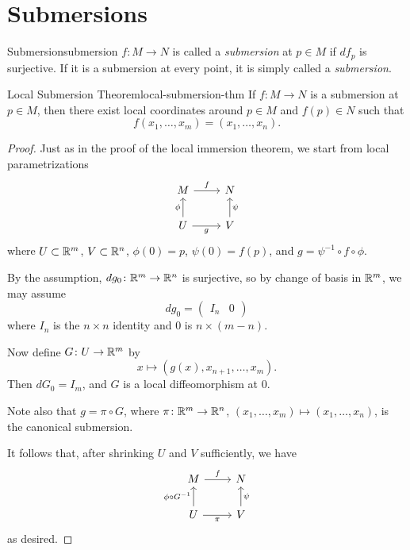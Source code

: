 
\section{Submersions}

\begin{definition}{Submersion}{submersion}
    $f \colon M \to N$ is called a \emph{submersion} at $p \in M$ if $df_p$ is surjective. If it is a submersion at every point, it is simply called a \emph{submersion}.
\end{definition}

\begin{theorem}{Local Submersion Theorem}{local-submersion-thm}
    If $f \colon M \to N$ is a submersion at $p \in M$, then there exist local coordinates around $p \in M$ and $f(p) \in N$ such that
    \[
        f(x_1, \ldots, x_m) = (x_1, \ldots, x_n).
    \]
\end{theorem}

\begin{proof}
    Just as in the proof of the local immersion theorem, we start from local parametrizations
    \[
    \begin{tikzcd}
        M \arrow[r, "f"] & N \\
        U \arrow[u, "\phi"] \arrow[r, "g"'] & V \arrow[u, "\psi"']
    \end{tikzcd}
    \]
    where $U \subset \mathbb{R}^m$, $V \subset \mathbb{R}^n$, $\phi(0) = p$, $\psi(0) = f(p)$, and $g = \psi^{-1} \circ f \circ \phi$.

    By the assumption, $dg_0 \colon \mathbb{R}^m \to \mathbb{R}^n$ is surjective, so by change of basis in $\mathbb{R}^m$, we may assume
    \[
        dg_0 = \begin{pmatrix} I_n & 0 \end{pmatrix}
    \]
    where $I_n$ is the $n \times n$ identity and $0$ is $n \times (m - n)$.

    Now define $G \colon U \to \mathbb{R}^m$ by
    \[
        x \mapsto (g(x), x_{n+1}, \ldots, x_m).
    \]
    Then $dG_0 = I_m$, and $G$ is a local diffeomorphism at $0$.

    Note also that $g = \pi \circ G$, where $\pi \colon \mathbb{R}^m \to \mathbb{R}^n$, $(x_1, \ldots, x_m) \mapsto (x_1, \ldots, x_n)$, is the canonical submersion.

    It follows that, after shrinking $U$ and $V$ sufficiently, we have
    \[
    \begin{tikzcd}
        M \arrow[r, "f"] & N \\
        U \arrow[u, "\phi \circ G^{-1}"] \arrow[r, "\pi"'] & V \arrow[u, "\psi"']
    \end{tikzcd}
    \]
    as desired.
\end{proof}

